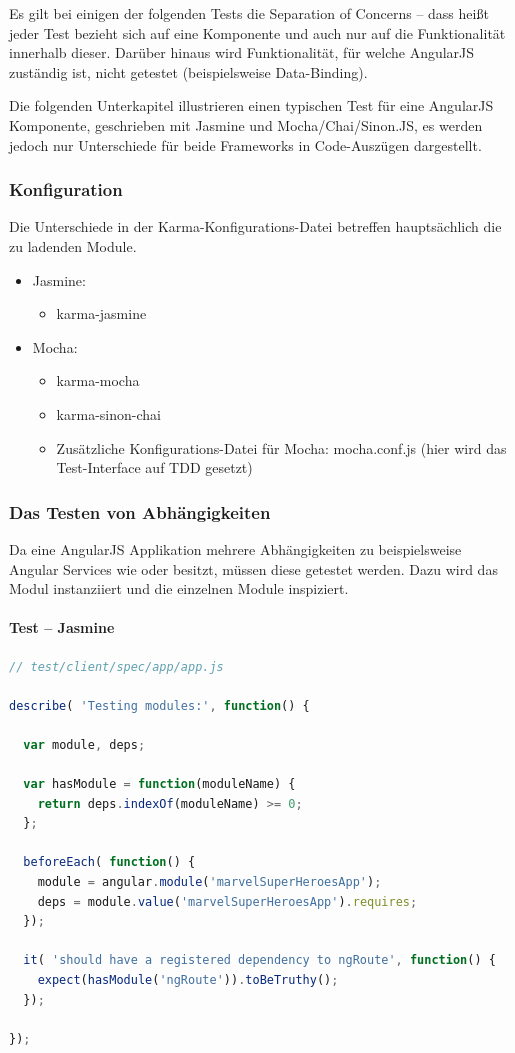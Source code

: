 Es gilt bei einigen der folgenden Tests die Separation of Concerns -- dass heißt jeder Test bezieht sich auf eine Komponente und auch nur auf die Funktionalität innerhalb dieser. Darüber hinaus wird Funktionalität, für welche AngularJS zuständig ist, nicht getestet (beispielsweise Data-Binding).

Die folgenden Unterkapitel illustrieren einen typischen Test für eine AngularJS Komponente, geschrieben mit Jasmine und Mocha/Chai/Sinon.JS, es werden jedoch nur Unterschiede für beide Frameworks in Code-Auszügen dargestellt.

\subsubsection{Konfiguration}
Die Unterschiede in der Karma-Konfigurations-Datei betreffen hauptsächlich die zu ladenden Module.
\begin{itemize}
  \item Jasmine:
    \begin{itemize}
      \item karma-jasmine
    \end{itemize}
  \item Mocha:
    \begin{itemize}
      \item karma-mocha
      \item karma-sinon-chai
      \item Zusätzliche Konfigurations-Datei für Mocha: mocha.conf.js (hier wird das Test-Interface auf TDD gesetzt)
    \end{itemize}
\end{itemize}

\newpage
\subsubsection{Das Testen von Abhängigkeiten}
Da eine AngularJS Applikation mehrere Abhängigkeiten zu beispielsweise Angular Services wie  oder  besitzt, müssen diese getestet werden. Dazu wird das Modul  instanziiert und die einzelnen Module inspiziert.

\paragraph{Test -- Jasmine}
\begin{lstlisting}[language=JavaScript, caption=TDD AngularJS - Dependencies - Jasmine]
// test/client/spec/app/app.js

describe( 'Testing modules:', function() {

  var module, deps;

  var hasModule = function(moduleName) {
    return deps.indexOf(moduleName) >= 0;
  };

  beforeEach( function() {
    module = angular.module('marvelSuperHeroesApp');
    deps = module.value('marvelSuperHeroesApp').requires;
  });

  it( 'should have a registered dependency to ngRoute', function() {
    expect(hasModule('ngRoute')).toBeTruthy();
  });

});
\end{lstlisting}

